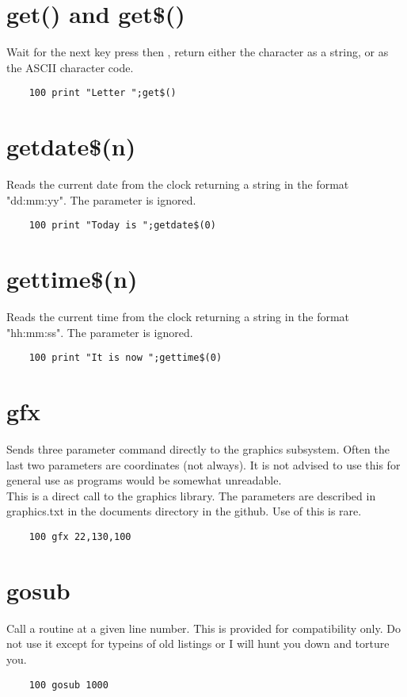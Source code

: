 \section*{get() and get\$()}
Wait for the next key press then , return either the character as a string, or as the ASCII character code. 
\example{}
\begin{verbatim}
	100 print "Letter ";get$()
\end{verbatim}

\section*{getdate\$(n)}
Reads the current date from the clock returning a string in the format "dd:mm:yy". The parameter is ignored.
\example{}
\begin{verbatim}
	100 print "Today is ";getdate$(0)
\end{verbatim}

\section*{gettime\$(n)}
Reads the current time from the clock returning a string in the format "hh:mm:ss". The parameter is ignored.
\example{}
\begin{verbatim}
	100 print "It is now ";gettime$(0)
\end{verbatim}

\section*{gfx}
Sends three parameter command directly to the graphics subsystem. Often the last two parameters are coordinates (not always).  It is not advised to use this for general use as programs would be somewhat unreadable.\\
This is a direct call to the graphics library. The parameters are described in graphics.txt in the documents directory in the github. Use of this is rare.
\example{}
\begin{verbatim}
	100 gfx 22,130,100
\end{verbatim}

\section*{gosub}
Call a routine at a given line number. This is provided for compatibility only. Do not use it except for typeins of old listings or I will hunt you down and torture you.  
\example{}
\begin{verbatim}
	100 gosub 1000
\end{verbatim}

